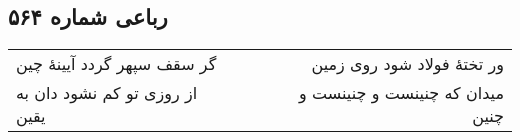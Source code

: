 \begin{center}
\section*{رباعی شماره ۵۶۴}
\label{sec:sh564}
\begin{longtable}{l p{0.5cm} r}
گر سقف سپهر گردد آیینهٔ چین
&&
ور تختهٔ فولاد شود روی زمین
\\
از روزی تو کم نشود دان به یقین
&&
میدان که چنینست و چنینست و چنین
\\
\end{longtable}
\end{center}
